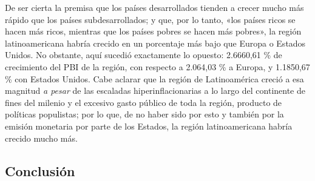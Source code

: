 \documentclass[12pt,a4paper,twoside]{book}
\begin{document}
De ser cierta la premisa que los países desarrollados tienden a crecer mucho más rápido que los países subdesarrollados; y que, por lo tanto, «los países ricos se hacen más ricos, mientras que los países pobres se hacen más pobres», la región latinoamericana habría crecido en un porcentaje más bajo que Europa o Estados Unidos. No obstante, aquí sucedió exactamente lo opuesto: 2.6660,61 \% de crecimiento del PBI de la región, con respecto a 2.064,03 \% a Europa, y 1.1850,67 \% con Estados Unidos. Cabe aclarar que la región de Latinoamérica creció a esa magnitud \textit{a pesar} de las escaladas hiperinflacionarias a lo largo del continente de fines del milenio y el excesivo gasto público de toda la región, producto de políticas populistas; por lo que, de no haber sido por esto y también por la emisión monetaria por parte de los Estados, la región latinoamericana habría crecido mucho más.

\subsection{Conclusión}

\end{document}
